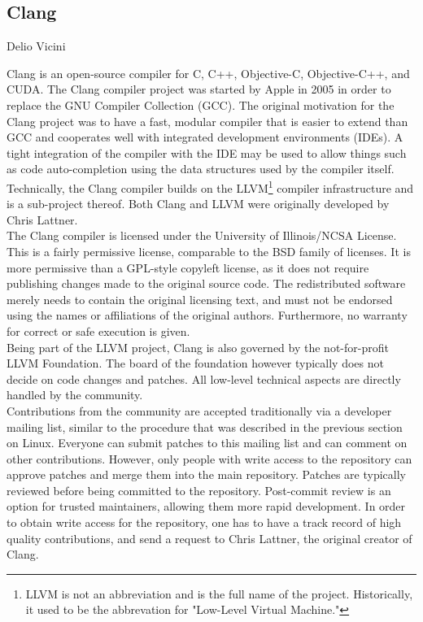 \subsection{Clang}{Delio Vicini}

Clang is an open-source compiler for C, C++, Objective-C, Objective-C++, and CUDA. The Clang compiler project was started by Apple in 2005 in order to replace the GNU Compiler Collection (GCC). The original motivation for the Clang project was to have a fast, modular compiler that is easier to extend than GCC and cooperates well with integrated development environments (IDEs).\cite{clang-motivation} A tight integration of the compiler with the IDE may be used to allow things such as code auto-completion using the data structures used by the compiler itself. Technically, the Clang compiler builds on the LLVM\footnote{LLVM is not an abbreviation and is the full name of the project. Historically, it used to be the abbrevation for "Low-Level Virtual Machine."} compiler infrastructure and is a sub-project thereof. Both Clang and LLVM were originally developed by Chris Lattner.\cite{lattner} \\

The Clang compiler is licensed under the University of Illinois/NCSA License.\cite{clang-policy} This is a fairly permissive license, comparable to the BSD family of licenses. It is more permissive than a GPL-style copyleft license, as it does not require publishing changes made to the original source code. The redistributed software merely needs to contain the original licensing text, and must not be endorsed using the names or affiliations of the original authors. Furthermore, no warranty for correct or safe execution is given.\cite{illinois-license} \\

Being part of the LLVM project, Clang is also governed by the not-for-profit LLVM Foundation.\cite{llvm-foundation} The board of the foundation however typically does not decide on code changes and patches. All low-level technical aspects are directly handled by the community.\cite{clang-policy} \\

Contributions from the community are accepted traditionally via a developer mailing list, similar to the procedure that was described in the previous section on Linux. Everyone can submit patches to this mailing list and can comment on other contributions. However, only people with write access to the repository can approve patches and merge them into the main repository. Patches are typically reviewed before being committed to the repository. Post-commit review is an option for trusted maintainers, allowing them more rapid development. In order to obtain write access for the repository, one has to have a track record of high quality contributions, and send a request to Chris Lattner, the original creator of Clang. \\

